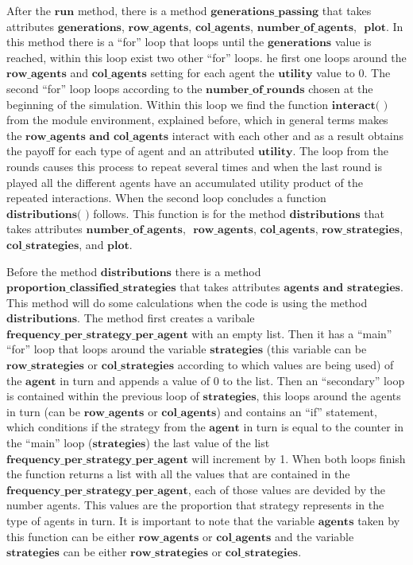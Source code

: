 \documentclass{book}
\begin{document}
After the $\textbf{run}$ method, there is a method $\textbf{generations\_passing}$ that takes attributes $\textbf{generations}$,  $\textbf{row\_agents}$, $\textbf{col\_agents}$, $\textbf{number\_of\_agents}$, $\textbf{ plot}$. In this method there is a ``for'' loop that loops until the $\textbf{generations}$ value is reached, within this loop exist two other ``for'' loops.
 he first one loops around the $\textbf{row\_agents}$ and  $\textbf{col\_agents}$ setting for each agent  the $\textbf{utility}$ value to 0. 
The second ``for'' loop loops according to the $\textbf{number\_of\_rounds}$ chosen at the beginning of the simulation. Within this loop we find the function $\textbf{interact( )}$ from the module environment, explained before, which in general terms makes the $\textbf{row\_agents and col\_agents}$ interact with each other and as a result obtains the payoff for each type of agent and an attributed $\textbf{utility}$. The loop from the rounds causes this process to repeat several times and when the last round is played all the different agents have an accumulated utility product of the repeated interactions.
When the second loop concludes a function $\textbf{distributions( )}$ follows. This function is for the method $\textbf{distributions}$ that takes attributes $\textbf{number\_of\_agents}$, $\textbf{ row\_agents}$, $\textbf{col\_agents}$, $\textbf{row\_strategies}$, $\textbf{col\_strategies}$, and$\textbf{ plot}$.

Before the method $\textbf{distributions}$ there is a method $\textbf{proportion\_classified\_strategies}$ that takes attributes $\textbf{agents and strategies}$. This method will do some calculations when the code is using the method $\textbf{distributions}$.   The method first creates a varibale $\textbf{frequency\_per\_strategy\_per\_agent}$ with an empty list. Then it has a ``main'' ``for'' loop that loops around the variable $\textbf{strategies}$ (this variable can be $\textbf{row\_strategies}$ or $\textbf{col\_strategies}$ according to which values are being used) of the $\textbf{agent}$ in turn and appends a value of 0 to the list. Then an ``secondary'' loop is contained within the previous loop of $\textbf{strategies}$, this loops around the agents in turn (can be $\textbf{row\_agents}$ or $\textbf{col\_agents}$) and contains an ``if'' statement, which conditions if  the strategy from the $\textbf{agent}$ in turn is equal to the counter in the ``main'' loop ($\textbf{strategies}$) the last value of the list $\textbf{frequency\_per\_strategy\_per\_agent}$ will increment by 1. When both loops finish the function returns a list with all the values that are contained in the $\textbf{frequency\_per\_strategy\_per\_agent}$, each of those values are devided by the number agents. This values are the proportion that strategy represents in the type of agents in turn. It is important to note that the variable $\textbf{agents}$ taken by this function can be either $\textbf{row\_agents}$ or $\textbf{col\_agents}$   and the variable $\textbf{strategies}$ can be either $\textbf{row\_strategies}$ or $\textbf{col\_strategies}$. 
\end{document}
